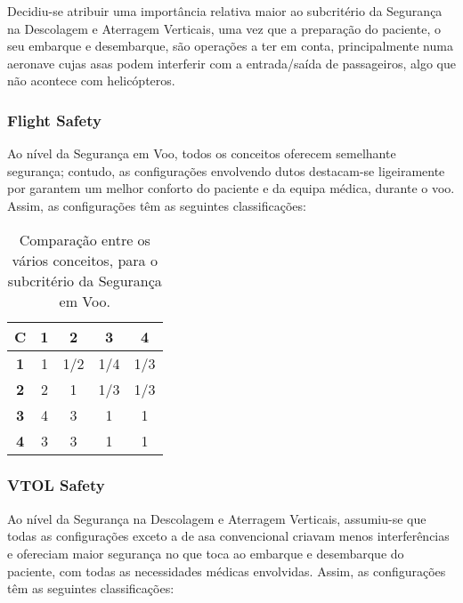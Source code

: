 Decidiu-se atribuir uma importância relativa maior ao subcritério da Segurança na Descolagem e Aterragem Verticais, uma vez que a preparação do paciente, o seu embarque e desembarque, são operações a ter em conta, principalmente numa aeronave cujas asas podem interferir com a entrada/saída de passageiros, algo que não acontece com helicópteros.


\subsubsection{Flight Safety}

Ao nível da Segurança em Voo, todos os conceitos oferecem semelhante segurança; contudo, as configurações envolvendo dutos destacam-se ligeiramente por garantem um melhor conforto do paciente e da equipa médica, durante o voo. Assim, as configurações têm as seguintes classificações:


\begin{table}[H]
\begin{center}
\caption{Comparação entre os vários conceitos, para o subcritério da Segurança em Voo.}
\begin{tabular}{ |c|c c c c| }
 \hline
 \textbf{C} & \textbf{1} & \textbf{2} & \textbf{3} & \textbf{4}  \\
\hline
 \textbf{1} & 1 & 1/2 & 1/4 & 1/3 \\
 \textbf{2} & 2 & 1 & 1/3 & 1/3  \\
 \textbf{3} & 4 & 3 & 1 & 1  \\
 \textbf{4} & 3 & 3 & 1 & 1  \\
\hline
\end{tabular}
\end{center}
\end{table}








\subsubsection{VTOL Safety}

Ao nível da Segurança na Descolagem e Aterragem Verticais, assumiu-se que todas as configurações exceto a de asa convencional criavam menos interferências e ofereciam maior segurança no que toca ao embarque e desembarque do paciente, com todas as necessidades médicas envolvidas. Assim, as configurações têm as seguintes classificações:



